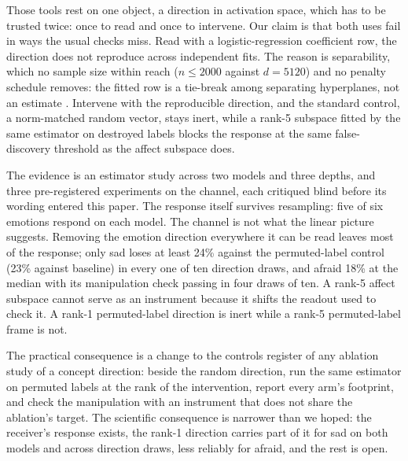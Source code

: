 \documentclass{article}
\begin{document}
Those tools rest on one object, a direction in activation space, which has to be trusted twice: once to read and once to intervene. Our claim is that both uses fail in ways the usual checks miss. Read with a logistic-regression coefficient row, the direction does not reproduce across independent fits. The reason is separability, which no sample size within reach ($n \le 2000$ against $d = 5120$) and no penalty schedule removes: the fitted row is a tie-break among separating hyperplanes, not an estimate \citep{rosset2004margin,soudry2018implicit,marks2023geometry}. Intervene with the reproducible direction, and the standard control, a norm-matched random vector, stays inert, while a rank-5 subspace fitted by the same estimator on destroyed labels blocks the response at the same false-discovery threshold as the affect subspace does.

The evidence is an estimator study across two models and three depths, and three pre-registered experiments on the channel, each critiqued blind before its wording entered this paper. The response itself survives resampling: five of six emotions respond on each model. The channel is not what the linear picture suggests. Removing the emotion direction everywhere it can be read leaves most of the response; only sad loses at least 24\% against the permuted-label control (23\% against baseline) in every one of ten direction draws, and afraid 18\% at the median with its manipulation check passing in four draws of ten. A rank-5 affect subspace cannot serve as an instrument because it shifts the readout used to check it. A rank-1 permuted-label direction is inert while a rank-5 permuted-label frame is not.

The practical consequence is a change to the controls register of any ablation study of a concept direction: beside the random direction, run the same estimator on permuted labels at the rank of the intervention, report every arm's footprint, and check the manipulation with an instrument that does not share the ablation's target. The scientific consequence is narrower than we hoped: the receiver's response exists, the rank-1 direction carries part of it for sad on both models and across direction draws, less reliably for afraid, and the rest is open.
\end{document}
